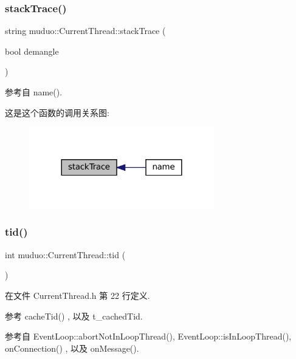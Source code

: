 \subsubsection{\texorpdfstring{stack\+Trace()}{stackTrace()}}
{\footnotesize\ttfamily string muduo\+::\+Current\+Thread\+::stack\+Trace (\begin{DoxyParamCaption}\item[{bool}]{demangle }\end{DoxyParamCaption})}



参考自 name().

这是这个函数的调用关系图\+:
\nopagebreak
\begin{figure}[H]
\begin{center}
\leavevmode
\includegraphics[width=228pt]{namespacemuduo_1_1CurrentThread_adb3a86b79370bd58610e2b8942980edf_icgraph}
\end{center}
\end{figure}
\mbox{\label{namespacemuduo_1_1CurrentThread_a27129392a2d642e96188636257bf13ca}} 
\subsubsection{\texorpdfstring{tid()}{tid()}}
{\footnotesize\ttfamily int muduo\+::\+Current\+Thread\+::tid (\begin{DoxyParamCaption}{ }\end{DoxyParamCaption})\hspace{0.3cm}{\ttfamily [inline]}}



在文件 Current\+Thread.\+h 第 22 行定义.



参考 cache\+Tid() , 以及 t\+\_\+cached\+Tid.



参考自 Event\+Loop\+::abort\+Not\+In\+Loop\+Thread(), Event\+Loop\+::is\+In\+Loop\+Thread(), on\+Connection() , 以及 on\+Message().

